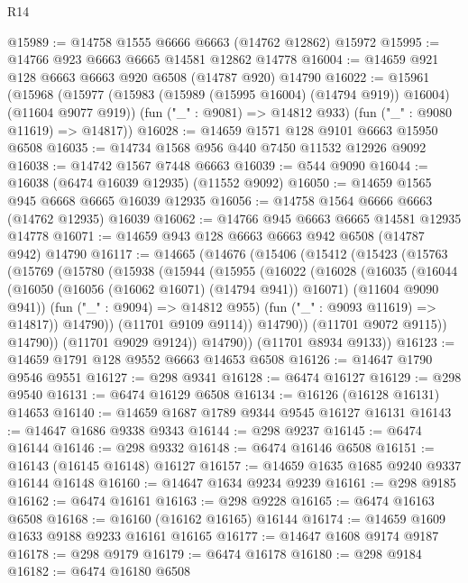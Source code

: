 \begin{lexlean}{R14}
\begin{coremodule}
@15989 := @14758 @1555 @6666 @6663 (@14762 @12862) @15972
@15995 := @14766 @923 @6663 @6665 @14581 @12862 @14778
@16004 := @14659 @921 @128 @6663 @6663 @920 @6508 (@14787 @920) @14790
@16022 := @15961
    (@15968
      (@15977 (@15983 (@15989 (@15995 @16004) (@14794 @919)) @16004) (@11604 @9077 @919))
      (fun ("_" : @9081) => @14812 @933)
      (fun ("_" : @9080 @11619) => @14817))
@16028 := @14659 @1571 @128 @9101 @6663 @15950 @6508
@16035 := @14734 @1568 @956 @440 @7450 @11532 @12926 @9092
@16038 := @14742 @1567 @7448 @6663
@16039 := @544 @9090
@16044 := @16038 (@6474 @16039 @12935) (@11552 @9092)
@16050 := @14659 @1565 @945 @6668 @6665 @16039 @12935
@16056 := @14758 @1564 @6666 @6663 (@14762 @12935) @16039
@16062 := @14766 @945 @6663 @6665 @14581 @12935 @14778
@16071 := @14659 @943 @128 @6663 @6663 @942 @6508 (@14787 @942) @14790
@16117 := @14665
    (@14676
      (@15406
        (@15412
          (@15423
            (@15763
              (@15769
                (@15780
                  (@15938
                    (@15944
                      (@15955
                        (@16022
                          (@16028
                            (@16035
                              (@16044
                                (@16050 (@16056 (@16062 @16071) (@14794 @941)) @16071)
                                (@11604 @9090 @941))
                              (fun ("_" : @9094) => @14812 @955)
                              (fun ("_" : @9093 @11619) => @14817))
                            @14790))
                        (@11701 @9109 @9114))
                      @14790))
                  (@11701 @9072 @9115))
                @14790))
            (@11701 @9029 @9124))
          @14790))
      (@11701 @8934 @9133))
@16123 := @14659 @1791 @128 @9552 @6663 @14653 @6508
@16126 := @14647 @1790 @9546 @9551
@16127 := @298 @9341
@16128 := @6474 @16127
@16129 := @298 @9540
@16131 := @6474 @16129 @6508
@16134 := @16126 (@16128 @16131) @14653
@16140 := @14659 @1687 @1789 @9344 @9545 @16127 @16131
@16143 := @14647 @1686 @9338 @9343
@16144 := @298 @9237
@16145 := @6474 @16144
@16146 := @298 @9332
@16148 := @6474 @16146 @6508
@16151 := @16143 (@16145 @16148) @16127
@16157 := @14659 @1635 @1685 @9240 @9337 @16144 @16148
@16160 := @14647 @1634 @9234 @9239
@16161 := @298 @9185
@16162 := @6474 @16161
@16163 := @298 @9228
@16165 := @6474 @16163 @6508
@16168 := @16160 (@16162 @16165) @16144
@16174 := @14659 @1609 @1633 @9188 @9233 @16161 @16165
@16177 := @14647 @1608 @9174 @9187
@16178 := @298 @9179
@16179 := @6474 @16178
@16180 := @298 @9184
@16182 := @6474 @16180 @6508

\end{coremodule}
\end{lexlean}
